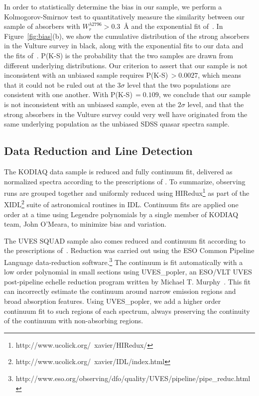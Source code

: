 \documentclass[iop,apj,numberedappendix,appendixfloats,twocolappendix]{emulateapj}
\begin{document}
In order to statistically determine the bias in our sample, we perform a Kolmogorov-Smirnov test to quantitatively measure the similarity between our sample of absorbers with $W_r^{\lambda2796} > 0.3$~{\AA} and the exponential fit of~\cite{Nestor2005}. In Figure~\ref{fig:bias}(b), we show the cumulative distribution of the strong absorbers in the Vulture survey in black, along with the exponential fits to our data and the fits of~\cite{Nestor2005}. P(K-S) is the probability that the two samples are drawn from different underlying distributions. Our criterion to assert that our sample is not inconsistent with an unbiased sample requires P(K-S)$\, > 0.0027$, which means that it could not be ruled out at the $3\sigma$ level that the two populations are consistent with one another. With P(K-S)$\, = 0.109$, we conclude that our sample is not inconsistent with an unbiased sample, even at the $2\sigma$ level, and that the strong absorbers in the Vulture survey could very well have originated from the same underlying population as the unbiased SDSS quasar spectra sample.


\subsection{Data Reduction and Line Detection}
\label{sec:detection}

The KODIAQ data sample is reduced and fully continuum fit, delivered as normalized spectra according to the prescriptions of \cite{OMeara2015}. To summarize, observing runs are grouped together and uniformly reduced using HIRedux\footnote{http://www.ucolick.org/~xavier/HIRedux/} as part of the XIDL\footnote{http://www.ucolick.org/~xavier/IDL/index.html} suite of astronomical routines in IDL. Continuum fits are applied one order at a time using Legendre polynomials by a single member of KODIAQ team, John O'Meara, to minimize bias and variation. 

The UVES SQUAD sample also comes reduced and continuum fit according to the prescriptions of~\cite{King2012,Bagdonaite2014,Murphy2016,Murphyprep}. Reduction was carried out using the ESO Common Pipeline Language data-reduction software.\footnote{http://www.eso.org/observing/dfo/quality/UVES/pipeline/pipe\_reduc.html} The continuum is fit automatically with a low order polynomial in small sections using UVES\_popler, an ESO/VLT UVES post-pipeline echelle reduction program written by Michael T. Murphy~\citep{MurphyPOPLER}. This fit can incorrectly estimate the continuum around narrow emission regions and broad absorption features. Using UVES\_popler, we add a higher order continuum fit to such regions of each spectrum, always preserving the continuity of the continuum with non-absorbing regions. 
\end{document}

